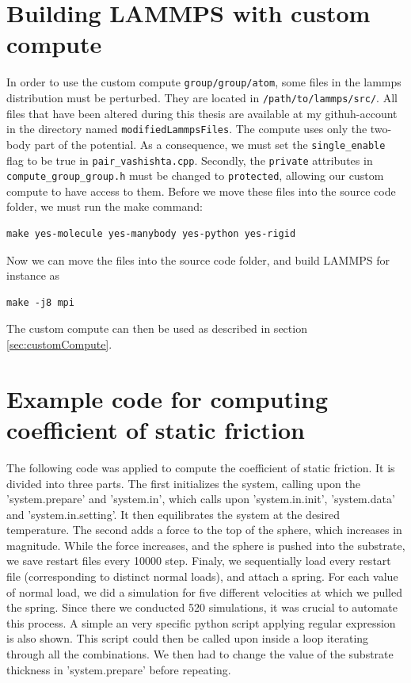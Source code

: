 \documentclass[twoside,english]{uiofysmaster}
\begin{document}
\section{Building LAMMPS with custom compute}
In order to use the custom compute \texttt{group/group/atom}, some files in the lammps distribution must be perturbed.
They are located in \texttt{/path/to/lammps/src/}.  
All files that have been altered during this thesis are available at my githuh-account in the directory named \texttt{modifiedLammpsFiles}.  
The compute uses only the two-body part of the potential. 
As a consequence, we must set the \texttt{single\_enable} flag to be true in \texttt{pair\_vashishta.cpp}. 
Secondly, the \texttt{private} attributes in \texttt{compute\_group\_group.h} must be changed to \texttt{protected}, allowing our custom compute to have access to them.
Before we move these files into  the source code folder, we must run the make command:
\begin{lstlisting}
make yes-molecule yes-manybody yes-python yes-rigid 
\end{lstlisting}
Now we can move the files into the source code folder, and build LAMMPS for instance as
\begin{lstlisting}
make -j8 mpi
\end{lstlisting}
The custom compute can then be used as described in section \ref{sec:customCompute}.



\section{Example code for computing coefficient of static friction}
The following code was applied to compute the coefficient of static friction. 
It is divided into three parts.
The first initializes the system, calling upon the 'system.prepare' and 'system.in', which calls upon 'system.in.init', 'system.data' and 'system.in.setting'. 
It then equilibrates the system at the desired temperature.
The second adds a force to the top of the sphere, which increases in magnitude. 
While the force increases, and the sphere is pushed into the substrate, we save restart files every 10000 step. 
Finaly, we sequentially load every restart file (corresponding to distinct normal loads), and attach a spring.
For each value of normal load, we did a simulation for five different velocities at which we pulled the spring.
Since there we conducted 520 simulations, it was crucial to automate this process. 
A simple an very specific python script applying regular expression is also shown.
This script could then be called upon inside a loop iterating through all the combinations.
We then had to change the value of the substrate thickness in 'system.prepare' before repeating.
\end{document}
